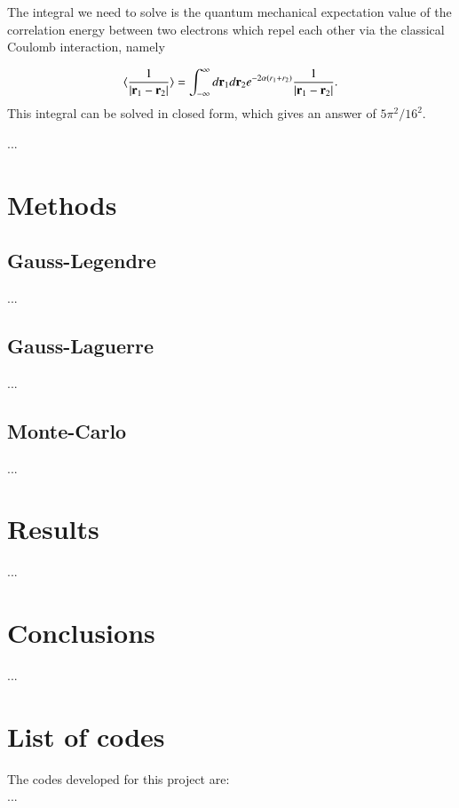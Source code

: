\documentclass{article}
\begin{document}
\begin{multicols}{2}
The integral we need to solve is the quantum mechanical expectation value of the correlation energy between two electrons which repel each other via the classical Coulomb interaction, namely

\begin{equation}\label{eq:correlationenergy}
	\langle \frac{1}{|{\bf r}_1-{\bf r}_2|} \rangle = \int_{-\infty}^{\infty} d{\bf r}_1d{\bf r}_2  e^{-2\alpha (r_1+r_2)}\frac{1}{|{\bf r}_1-{\bf r}_2|}.
\end{equation}
This integral can be solved in closed form, which gives an answer of $5\pi^2/16^2$.


...


\section{Methods}

\subsection{Gauss-Legendre}
...

\subsection{Gauss-Laguerre}
...

\subsection{Monte-Carlo}
...


\section{Results}
...



\section{Conclusions}
...





\section{List of codes}

The codes developed for this project are:\\
...

\end{multicols}
\end{document}
